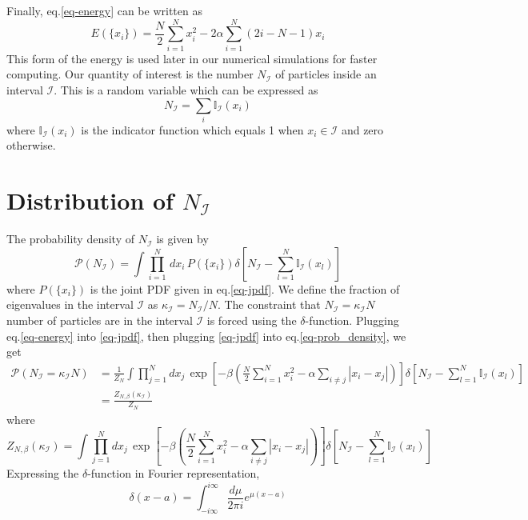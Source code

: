 \documentclass[11pt]{article}
\begin{document}
Finally, eq.\eqref{eq-energy} can be written as
\begin{equation}
E(\{x_i\})=\frac{N}{2}\sum_{i=1}^Nx_i^2-2 \alpha \sum_{i=1}^N(2i-N-1)x_i\label{eq-energy_modified}
\end{equation}
This form of the energy is used later in our numerical simulations for faster computing. Our quantity of interest is the number $N_\mathcal{I}$ of particles inside an interval $\mathcal{I}$. This is a random variable which can be expressed as 
$$N_\mathcal{I}=\sum_i\mathbb{I}_\mathcal{I}(x_i)$$
where $\mathbb{I}_\mathcal{I}(x_i)$ is the indicator function which equals 1 when $x_i\in \mathcal{I}$ and zero otherwise.


\section{Distribution of $N_\mathcal{I}$}
The probability density of $N_\mathcal{I}$ is given by
\begin{equation}
\mathcal{P}(N_\mathcal{I})=\int\prod_{i=1}^N\, dx_i\, P(\{x_i\})\delta\left[N_\mathcal{I}-\sum_{l=1}^N\mathbb{I}_\mathcal{I}(x_l)\right]\label{eq-prob_density}
\end{equation}
where $P(\{x_i\})$ is the joint PDF given in eq.\eqref{eq-jpdf}. We define the fraction of eigenvalues in the interval $\mathcal{I}$ as $\kappa_\mathcal{I}=N_\mathcal{I}/N$. The constraint that $N_\mathcal{I} = \kappa_\mathcal{I}N$ number of particles are in the interval $\mathcal{I}$ is forced using the $\delta$-function. Plugging eq.\eqref{eq-energy} into \eqref{eq-jpdf}, then plugging \eqref{eq-jpdf} into eq.\eqref{eq-prob_density}, we get
\begin{align*}
\mathcal{P}(N_\mathcal{I} = \kappa_\mathcal{I}N) &= \frac{1}{Z_N}\int\prod_{j=1}^Ndx_j\,\exp\left[-\beta\left(\frac{N}{2}\sum_{i=1}^Nx_i^2- \alpha \sum_{i\neq j}|x_i-x_j|\right)\right]\delta\left[N_\mathcal{I}-\sum_{l=1}^N\mathbb{I}_\mathcal{I}(x_l)\right]\\
&=\frac{Z_{N,\beta}(\kappa_\mathcal{I})}{Z_N}
\end{align*}
where
\begin{equation}
Z_{N,\beta}(\kappa_\mathcal{I}) = \int\prod_{j=1}^Ndx_j\,\exp\left[-\beta\left(\frac{N}{2}\sum_{i=1}^Nx_i^2- \alpha \sum_{i\neq j}|x_i-x_j|\right)\right]\delta\left[N_\mathcal{I}-\sum_{l=1}^N\mathbb{I}_\mathcal{I}(x_l)\right]\label{eq-znb}
\end{equation}
Expressing the $\delta$-function in Fourier representation,
$$
\delta(x-a) = \int_{-i\infty}^{i\infty}\frac{d\mu }{2\pi i}e^{\mu(x-a)}
$$ 
\end{document}
